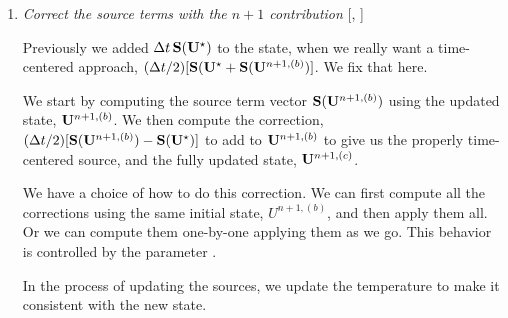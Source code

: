 \begin{enumerate}
  After these checks, we check the state for NaNs.


\item \label{strang:newsource} {\em Correct the source terms with the $n+1$ contribution}
  [, ]

  Previously we added $\Delta t\, {\bf S}({\bf U}^\star)$ to the state, when
  we really want a time-centered approach, $(\Delta t/2)[{\bf S}({\bf U}^\star
    + {\bf S}({\bf U}^{n+1,(b)})]$.  We fix that here.

  We start by computing the source term vector ${\bf S}({\bf U}^{n+1,(b)})$
  using the updated state, ${\bf U}^{n+1,(b)}$.  We then compute the
  correction, $(\Delta t/2)[{\bf S}({\bf U}^{n+1,(b)}) - {\bf S}({\bf U}^\star)]$ to
  add to ${\bf U}^{n+1,(b)}$ to give us the properly time-centered source,
  and the fully updated state, ${\bf U}^{n+1,(c)}$.

  We have a choice of how to do this correction.  We can first compute
  all the corrections using the same initial state, $U^{n+1,(b)}$,
  and then apply them all.  Or we can compute them one-by-one applying
  them as we go.  This behavior is controlled by the parameter
  .

  In the process of updating the sources, we update the temperature to
  make it consistent with the new state.





\end{enumerate}
